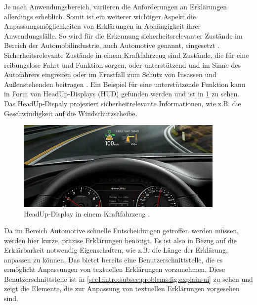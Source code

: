 Je nach Anwendungsbereich, variieren die Anforderungen an Erklärungen allerdings erheblich.
Somit ist ein weiterer wichtiger Aspekt die Anpassungsmöglichkeiten von Erklärungen in Abhängigkeit ihrer Anwendungsfälle.
So wird \smmir{} für die Erkennung sicherheitsrelevanter Zustände im Bereich der Automobilindustrie, auch Automotive genannt, eingesetzt \cite{jour-smmir}.
Sicherheitsrelevante Zustände in einem Kraftfahrzeug sind Zustände, die für eine reibungslose Fahrt und Funktion sorgen, oder unterstützend und im Sinne des Autofahrers eingreifen oder im Ernstfall zum Schutz von Insassen und Außenstehenden beitragen \cite{kfz-safety-states}.
Ein Beispiel für eine unterstützende Funktion kann in Form von HeadUp-Displays (HUD) gefunden werden und ist in \cref{sec1:intro:subsec:problems:fig:automotive-hud} zu sehen. Das HeadUp-Dispaly projeziert sicherheitrelevante Informationen, wie z.B. die Geschwindigkeit auf die Windschutzscheibe.
\begin{figure}[htb]
    \centering
    \includegraphics[width=0.9\textwidth]{resources/images/automotive-hud.png}
    \caption{HeadUp-Display in einem Kraftfahrzeug \cite{head-up-display}.}
    \label{sec1:intro:subsec:problems:fig:automotive-hud}
\end{figure}
Da im Bereich Automotive schnelle Entscheidungen getroffen werden müssen, werden hier kurze, präzise Erklärungen benötigt.
Es ist also in Bezug auf die Erklärbarkeit notwendig Eigenschaften, wie z.B. die Länge der Erklärung, anpassen zu können.
Das \gmaf{} bietet bereits eine Benutzerschnittstelle, die es ermöglicht Anpassungen von textuellen Erklärungen vorzunehmen. Diese Benutzerschnittstelle ist in \cref{sec1:intro:subsec:problems:fig:explain-ui} zu sehen und zeigt die Elemente, die zur Anpassung von textuellen Erklärungen vorgesehen sind.
